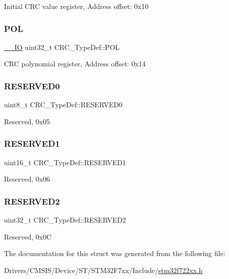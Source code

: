 Initial C\+RC value register, Address offset\+: 0x10 \mbox{\label{struct_c_r_c___type_def_a0a6a8675609cee77ff162e575cfc74e8}} 
\subsubsection{\texorpdfstring{POL}{POL}}
{\footnotesize\ttfamily \mbox{\hyperlink{core__sc300_8h_aec43007d9998a0a0e01faede4133d6be}{\+\_\+\+\_\+\+IO}} uint32\+\_\+t C\+R\+C\+\_\+\+Type\+Def\+::\+P\+OL}

C\+RC polynomial register, Address offset\+: 0x14 \mbox{\label{struct_c_r_c___type_def_a70dfd1730dba65041550ef55a44db87c}} 
\subsubsection{\texorpdfstring{RESERVED0}{RESERVED0}}
{\footnotesize\ttfamily uint8\+\_\+t C\+R\+C\+\_\+\+Type\+Def\+::\+R\+E\+S\+E\+R\+V\+E\+D0}

Reserved, 0x05 \mbox{\label{struct_c_r_c___type_def_a8b205c6e25b1808ac016db2356b3021d}} 
\subsubsection{\texorpdfstring{RESERVED1}{RESERVED1}}
{\footnotesize\ttfamily uint16\+\_\+t C\+R\+C\+\_\+\+Type\+Def\+::\+R\+E\+S\+E\+R\+V\+E\+D1}

Reserved, 0x06 \mbox{\label{struct_c_r_c___type_def_a4dd260a7d589d62975619a42f9a6abe4}} 
\subsubsection{\texorpdfstring{RESERVED2}{RESERVED2}}
{\footnotesize\ttfamily uint32\+\_\+t C\+R\+C\+\_\+\+Type\+Def\+::\+R\+E\+S\+E\+R\+V\+E\+D2}

Reserved, 0x0C 

The documentation for this struct was generated from the following file\+:\begin{DoxyCompactItemize}
\item 
Drivers/\+C\+M\+S\+I\+S/\+Device/\+S\+T/\+S\+T\+M32\+F7xx/\+Include/\mbox{\hyperlink{stm32f722xx_8h}{stm32f722xx.\+h}}\end{DoxyCompactItemize}
